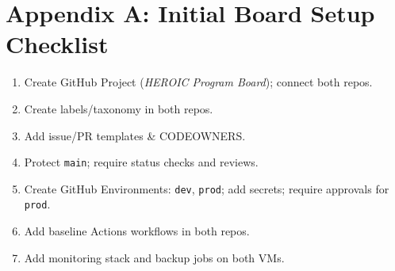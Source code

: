 \documentclass[11pt]{article}
\begin{document}
\section{Appendix A: Initial Board Setup Checklist}
\begin{enumerate}[leftmargin=1.2em]
  \item Create GitHub Project (\textit{HEROIC Program Board}); connect both repos.
  \item Create labels/taxonomy in both repos.
  \item Add issue/PR templates \& CODEOWNERS.
  \item Protect \texttt{main}; require status checks and reviews.
  \item Create GitHub Environments: \texttt{dev}, \texttt{prod}; add secrets; require approvals for \texttt{prod}.
  \item Add baseline Actions workflows in both repos.
  \item Add monitoring stack and backup jobs on both VMs.
\end{enumerate}
\end{document}
